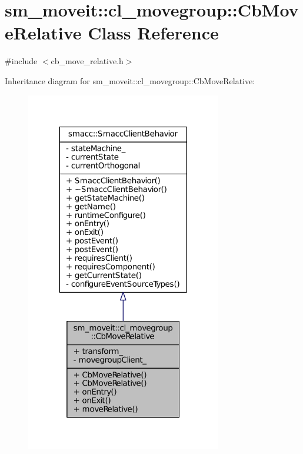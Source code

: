 \hypertarget{classsm__moveit_1_1cl__movegroup_1_1CbMoveRelative}{}\section{sm\+\_\+moveit\+:\+:cl\+\_\+movegroup\+:\+:Cb\+Move\+Relative Class Reference}
\label{classsm__moveit_1_1cl__movegroup_1_1CbMoveRelative}


{\ttfamily \#include $<$cb\+\_\+move\+\_\+relative.\+h$>$}



Inheritance diagram for sm\+\_\+moveit\+:\+:cl\+\_\+movegroup\+:\+:Cb\+Move\+Relative\+:
\nopagebreak
\begin{figure}[H]
\begin{center}
\leavevmode
\includegraphics[width=242pt]{classsm__moveit_1_1cl__movegroup_1_1CbMoveRelative__inherit__graph}
\end{center}
\end{figure}


